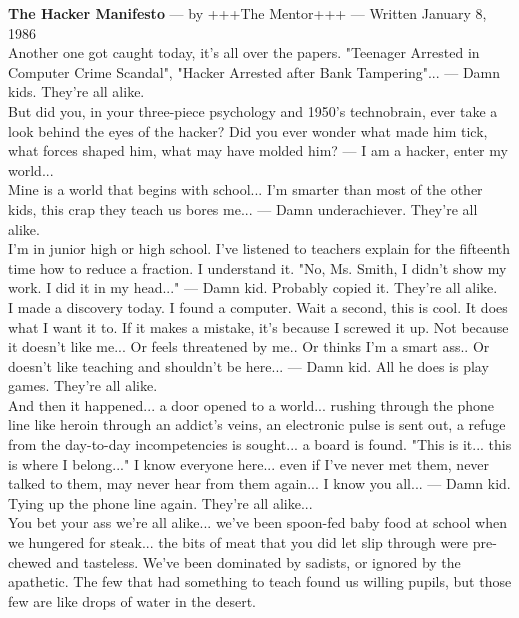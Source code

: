 \documentclass[11pt,twoside,a4paper]{book}
\begin{document}
\begin{minipage}[h]{0.95\textwidth}
	\small
	\textbf{\large The Hacker Manifesto} --- by +++The Mentor+++ --- Written January 8, 1986~\\
	
	Another one got caught today, it's all over the papers. "Teenager Arrested in Computer Crime Scandal", "Hacker Arrested after Bank Tampering"... --- Damn kids. They're all alike.~\\
	
	But did you, in your three-piece psychology and 1950's technobrain, ever take a look behind the eyes of the hacker? Did you ever wonder what made him tick, what forces shaped him, what may have molded him? --- I am a hacker, enter my world...~\\
	
	Mine is a world that begins with school... I'm smarter than most of the other kids, this crap they teach us bores me... --- Damn underachiever. They're all alike.~\\
	
	I'm in junior high or high school. I've listened to teachers explain for the fifteenth time how to reduce a fraction. I understand it. "No, Ms. Smith, I didn't show my work. I did it in my head..." --- Damn kid. Probably copied it. They're all alike.~\\
	
	I made a discovery today. I found a computer. Wait a second, this is cool. It does what I want it to. If it makes a mistake, it's because I screwed it up. Not because it doesn't like me... Or feels threatened by me.. Or thinks I'm a smart ass.. Or doesn't like teaching and shouldn't be here... --- Damn kid. All he does is play games. They're all alike.~\\
	
	And then it happened... a door opened to a world... rushing through the phone line like heroin through an addict's veins, an electronic pulse is sent out, a refuge from the day-to-day incompetencies is sought... a board is found. "This is it... this is where I belong..." I know everyone here... even if I've never met them, never talked to them, may never hear from them again... I know you all... --- Damn kid. Tying up the phone line again. They're all alike...~\\
	
	You bet your ass we're all alike... we've been spoon-fed baby food at school when we hungered for steak... the bits of meat that you did let slip through were pre-chewed and tasteless. We've been dominated by sadists, or ignored by the apathetic. The few that had something to teach found us willing pupils, but those few are like drops of water in the desert.~\\
	

\end{minipage}
\end{document}
